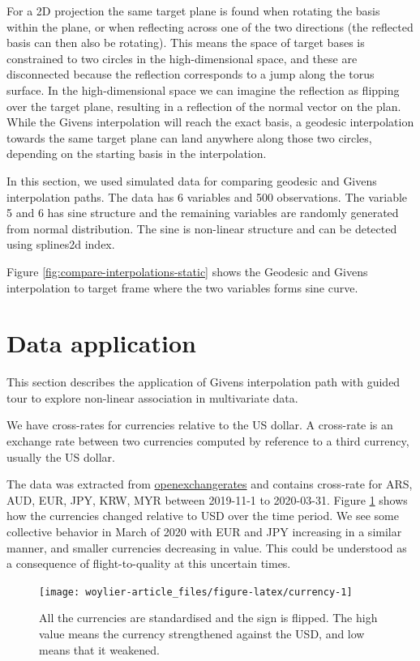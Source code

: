 For a 2D projection the same target plane is found when rotating the
basis within the plane, or when reflecting across one of the two
directions (the reflected basis can then also be rotating). This means
the space of target bases is constrained to two circles in the
high-dimensional space, and these are disconnected because the
reflection corresponds to a jump along the torus surface. In the
high-dimensional space we can imagine the reflection as flipping over
the target plane, resulting in a reflection of the normal vector on the
plan. While the Givens interpolation will reach the exact basis, a
geodesic interpolation towards the same target plane can land anywhere
along those two circles, depending on the starting basis in the
interpolation.

In this section, we used simulated data for comparing geodesic and
Givens interpolation paths. The data has 6 variables and 500
observations. The variable 5 and 6 has sine structure and the remaining
variables are randomly generated from normal distribution. The sine is
non-linear structure and can be detected using splines2d index.

Figure \ref{fig:compare-interpolations-static} shows the Geodesic and
Givens interpolation to target frame where the two variables forms sine
curve.

\hypertarget{data-application}{%
\section{Data application}\label{data-application}}

This section describes the application of Givens interpolation path with
guided tour to explore non-linear association in multivariate data.

We have cross-rates for currencies relative to the US dollar. A
cross-rate is an exchange rate between two currencies computed by
reference to a third currency, usually the US dollar.

The data was extracted from
\href{https://openexchangerates.org}{openexchangerates} and contains
cross-rate for ARS, AUD, EUR, JPY, KRW, MYR between 2019-11-1 to
2020-03-31. Figure \ref{fig:currency} shows how the currencies changed
relative to USD over the time period. We see some collective behavior in
March of 2020 with EUR and JPY increasing in a similar manner, and
smaller currencies decreasing in value. This could be understood as a
consequence of flight-to-quality at this uncertain times.

\begin{Schunk}
\begin{figure}
\texttt{[image: woylier-article\_files/figure-latex/currency-1]} \caption[All the currencies are standardised and the sign is flipped]{All the currencies are standardised and the sign is flipped. The high value means the currency strengthened against the USD, and low means that it weakened.}\label{fig:currency}
\end{figure}
\end{Schunk}

